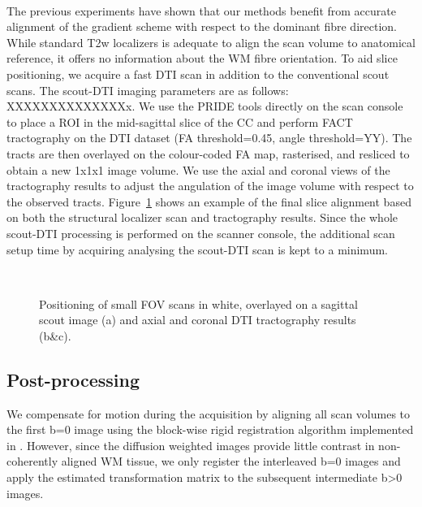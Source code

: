 \paragraph{}
The previous experiments have shown that our \SF{} methods benefit from accurate alignment of the gradient scheme with respect to the dominant fibre direction. While standard T2w localizers is adequate to align the scan volume to anatomical reference, it offers no information about the WM fibre orientation. To aid slice positioning, we acquire a fast DTI scan in addition to the conventional scout scans. The scout-DTI imaging parameters are as follows: XXXXXXXXXXXXXXx. We use the PRIDE tools directly on the scan console to place a ROI in the mid-sagittal slice of the CC and perform FACT tractography on the DTI dataset (FA threshold=0.45, angle threshold=YY). The tracts are then overlayed on the colour-coded FA map, rasterised, and resliced to obtain a new 1x1x1 image volume. We use the axial and coronal views of the tractography results to adjust the angulation of the \SF{} image volume with respect to the observed tracts.  Figure~\ref{fig:chap9 FOV positioning} shows an example of the final slice alignment based on both the structural localizer scan and tractography results. Since the whole scout-DTI processing is performed on the scanner console, the additional scan setup time by acquiring analysing the scout-DTI scan is kept to a minimum.

\begin{figure}[ht]
	\centering
	\begin{minipage}{0.35\textwidth}
	\\
	\end{minipage}\hspace{0.05\textwidth}
	\begin{minipage}{0.53\textwidth}
	\end{minipage}
	
	\caption{Positioning of small FOV scans in white, overlayed on a sagittal scout image (a) and axial and coronal DTI tractography results (b\&c).}
	\label{fig:chap9 FOV positioning}	
\end{figure}
\subsection*{Post-processing}
We compensate for motion during the acquisition by aligning all scan volumes to the first b=0 image using the block-wise rigid registration algorithm \citep{XX} implemented in \citep{niftyreg}. However, since the diffusion weighted images provide little contrast in non-coherently aligned WM tissue, we only register the interleaved b=0 images and apply the estimated transformation matrix to the subsequent intermediate b>0 images.   

